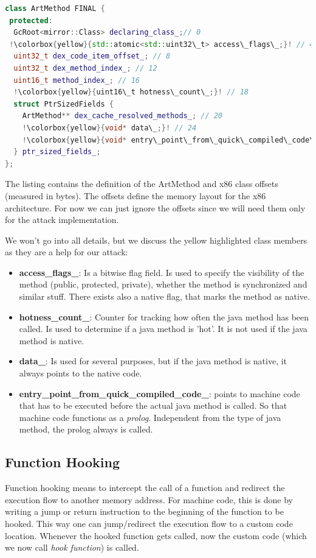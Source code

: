 \begin{lstlisting}[language=C++, style=CppCodeStyle, caption=ArtMethod and x86 offsets \cite{ArtMethodOreoRev36}, label=ArtMethodLabel,
escapechar=!]
class ArtMethod FINAL { 
 protected:
  GcRoot<mirror::Class> declaring_class_;// 0
 !\colorbox{yellow}{std::atomic<std::uint32\_t> access\_flags\_;}! // 4
  uint32_t dex_code_item_offset_; // 8
  uint32_t dex_method_index_; // 12
  uint16_t method_index_; // 16
  !\colorbox{yellow}{uint16\_t hotness\_count\_;}! // 18
  struct PtrSizedFields {
    ArtMethod** dex_cache_resolved_methods_; // 20
    !\colorbox{yellow}{void* data\_;}! // 24
    !\colorbox{yellow}{void* entry\_point\_from\_quick\_compiled\_code\_;}! // 28
  } ptr_sized_fields_;
};
\end{lstlisting}

The listing contains the definition of the ArtMethod and x86 class offsets (measured in bytes). The offsets define the memory layout for the x86 architecture. For now we can just ignore the offsets since we will need them only for the attack implementation.

We won't go into all details, but we discuss the yellow highlighted class members as they are a help for our attack:

\begin{itemize}
\item \textbf{access\_flags\_}: Is a bitwise flag field. Is used to specify the visibility of the method (public, protected, private), whether the method is synchronized and similar stuff. There exists also a native flag, that marks the method as native.
\item \textbf{hotness\_count\_}: Counter for tracking how often the java method has been called. Is used to determine if a java method is 'hot'. It is not used if the java method is native.
\item \textbf{data\_}: Is used for several purposes, but if the java method is native, it always points to the native code.
\item \textbf{entry\_point\_from\_quick\_compiled\_code\_}: points to machine code that has to be executed before the actual java method is called. So that machine code functions as a \emph{prolog}. Independent from the type of java method, the prolog always is called.
\end{itemize}

\subsection{Function Hooking}
Function hooking means to intercept the call of a function and redirect the execution flow to another memory address.
For machine code, this is done by writing a jump or return instruction to the beginning of the function to be hooked. This way one can jump/redirect the execution flow to a custom code location. 
Whenever the hooked function gets called, now the custom code (which we now call \emph{hook function}) is called.

